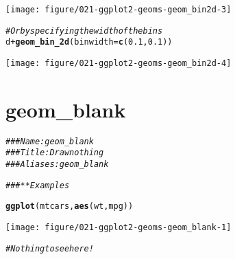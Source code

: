 \documentclass[a4paper,titlepage]{tufte-handout}\usepackage[]{graphicx}\usepackage[]{xcolor}
\makeatletter
\def\maxwidth{ %
  \ifdim\Gin@nat@width>\linewidth
    \linewidth
  \else
    \Gin@nat@width
  \fi
}
\newcommand{\hlnum}[1]{\textcolor[rgb]{0.686,0.059,0.569}{#1}}%
\newcommand{\hlcom}[1]{\textcolor[rgb]{0.678,0.584,0.686}{\textit{#1}}}%
\newcommand{\hlopt}[1]{\textcolor[rgb]{0,0,0}{#1}}%
\newcommand{\hldef}[1]{\textcolor[rgb]{0.345,0.345,0.345}{#1}}%
\newcommand{\hlkwc}[1]{\textcolor[rgb]{0.333,0.667,0.333}{#1}}%
\newcommand{\hlkwd}[1]{\textcolor[rgb]{0.737,0.353,0.396}{\textbf{#1}}}%
\newenvironment{kframe}{%
 \def\at@end@of@kframe{}%
 \ifinner\ifhmode%
  \def\at@end@of@kframe{\end{minipage}}%
  \begin{minipage}{\columnwidth}%
 \fi\fi%
 \def\FrameCommand##1{\hskip\@totalleftmargin \hskip-\fboxsep
 \colorbox{shadecolor}{##1}\hskip-\fboxsep
     \hskip-\linewidth \hskip-\@totalleftmargin \hskip\columnwidth}%
 \MakeFramed {\advance\hsize-\width
   \@totalleftmargin\z@ \linewidth\hsize
   \@setminipage}}%
 {\par\unskip\endMakeFramed%
 \at@end@of@kframe}
\newenvironment{knitrout}{}{} %
\makeatother
\begin{document}
\begin{knitrout}
\begin{kframe}
{\ttfamily\noindent\color{warningcolor}{\#\# Warning: Removed 478 rows containing non-finite outside the scale range\\\#\# (`stat\_bin2d()`).}}

{\ttfamily\noindent\color{warningcolor}{\#\# Warning: Removed 5 rows containing missing values or values outside the scale range\\\#\# (`geom\_tile()`).}}\end{kframe}
\texttt{[image: figure/021-ggplot2-geoms-geom\_bin2d-3]} 
\begin{kframe}\begin{alltt}
\hlcom{# Or by specifying the width of the bins}
\hldef{d} \hlopt{+} \hlkwd{geom_bin_2d}\hldef{(}\hlkwc{binwidth} \hldef{=} \hlkwd{c}\hldef{(}\hlnum{0.1}\hldef{,} \hlnum{0.1}\hldef{))}
\end{alltt}


{\ttfamily\noindent\color{warningcolor}{\#\# Warning: Removed 478 rows containing non-finite outside the scale range\\\#\# (`stat\_bin2d()`).\\\#\# Removed 5 rows containing missing values or values outside the scale range\\\#\# (`geom\_tile()`).}}\end{kframe}
\texttt{[image: figure/021-ggplot2-geoms-geom\_bin2d-4]} 
\end{knitrout}


\section{geom\_blank}

\begin{knitrout}
\color{fgcolor}\begin{kframe}
\begin{alltt}
\hlcom{### Name: geom_blank}
\hlcom{### Title: Draw nothing}
\hlcom{### Aliases: geom_blank}

\hlcom{### ** Examples}

\hlkwd{ggplot}\hldef{(mtcars,} \hlkwd{aes}\hldef{(wt, mpg))}
\end{alltt}
\end{kframe}
\texttt{[image: figure/021-ggplot2-geoms-geom\_blank-1]} 
\begin{kframe}\begin{alltt}
\hlcom{# Nothing to see here!}
\end{alltt}
\end{kframe}
\end{knitrout}
\end{document}
